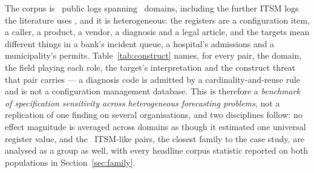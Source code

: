 The corpus is \nLogs\ public logs spanning \nDomains\ domains, including the
further ITSM logs the literature uses \citep{steeman2013bpic,amaral2018incident},
and it is heterogeneous: the registers are a configuration item, a caller, a
product, a vendor, a diagnosis and a legal article, and the targets mean
different things in a bank's incident queue, a hospital's admissions and a
municipality's permits. Table~\ref{tab:construct} names, for every pair, the
domain, the field playing each role, the target's interpretation and the
construct threat that pair carries --- a diagnosis code is admitted by a
cardinality-and-reuse rule and is not a configuration management database.
This is therefore a \emph{benchmark of specification sensitivity across
heterogeneous forecasting problems}, not a replication of one finding on
several organisations, and two disciplines follow: no effect magnitude is
averaged across domains as though it estimated one universal register value,
and the \nITSMPairs\ ITSM-like pairs, the closest family to the case study,
are analysed as a group as well, with every headline corpus statistic
reported on both populations in Section~\ref{sec:family}.
